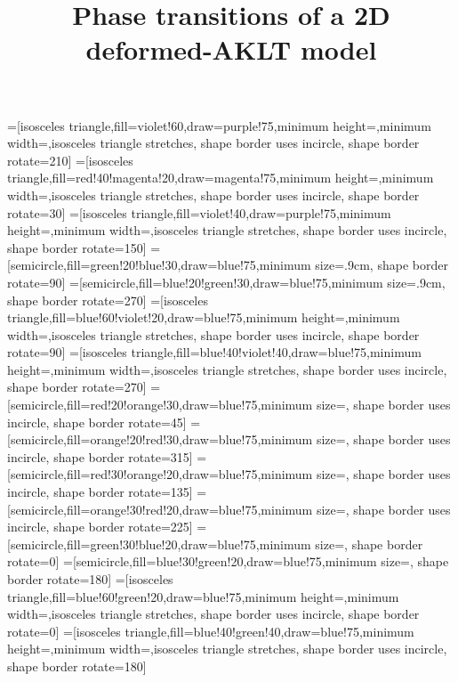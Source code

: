 \documentclass[aps,prb,letterpaper,superscriptaddress,twocolumn,showpacs,floatfix,10pt]{revtex4-1}
\begin{document}
=[isosceles triangle,fill=violet!60,draw=purple!75,minimum height=\isovheight,minimum width=\isovwidth,isosceles triangle stretches, shape border uses incircle, shape border rotate=210]
=[isosceles triangle,fill=red!40!magenta!20,draw=magenta!75,minimum height=\isovheight,minimum width=\isovwidth,isosceles triangle stretches, shape border uses incircle, shape border rotate=30]
=[isosceles triangle,fill=violet!40,draw=purple!75,minimum height=\isovheight,minimum width=\isovwidth,isosceles triangle stretches, shape border uses incircle, shape border rotate=150]
=[semicircle,fill=green!20!blue!30,draw=blue!75,minimum size=.9cm, shape border rotate=90]
=[semicircle,fill=blue!20!green!30,draw=blue!75,minimum size=.9cm, shape border rotate=270]
=[isosceles triangle,fill=blue!60!violet!20,draw=blue!75,minimum height=\isomheight,minimum width=\isomwidth,isosceles triangle stretches, shape border uses incircle, shape border rotate=90]
=[isosceles triangle,fill=blue!40!violet!40,draw=blue!75,minimum height=\isomheight,minimum width=\isomwidth,isosceles triangle stretches, shape border uses incircle, shape border rotate=270]
=[semicircle,fill=red!20!orange!30,draw=blue!75,minimum size=\halfheight, shape border uses incircle, shape border rotate=45]
=[semicircle,fill=orange!20!red!30,draw=blue!75,minimum size=\halfheight, shape border uses incircle, shape border rotate=315]
=[semicircle,fill=red!30!orange!20,draw=blue!75,minimum size=\halfheight, shape border uses incircle, shape border rotate=135]
=[semicircle,fill=orange!30!red!20,draw=blue!75,minimum size=\halfheight, shape border uses incircle, shape border rotate=225]
=[semicircle,fill=green!30!blue!20,draw=blue!75,minimum size=\halfheight, shape border rotate=0]
=[semicircle,fill=blue!30!green!20,draw=blue!75,minimum size=\halfheight, shape border rotate=180]
=[isosceles triangle,fill=blue!60!green!20,draw=blue!75,minimum height=\isomheight,minimum width=\isomwidth,isosceles triangle stretches, shape border uses incircle, shape border rotate=0]
=[isosceles triangle,fill=blue!40!green!40,draw=blue!75,minimum height=\isomheight,minimum width=\isomwidth,isosceles triangle stretches, shape border uses incircle, shape border rotate=180]

\title{ Phase transitions of a 2D deformed-AKLT model  }
\end{document}
